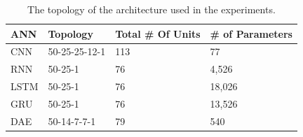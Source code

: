 \documentclass[11pt]{article}
\begin{document}

\begin{table}[]
\centering
\begin{tabular}{@{}llll@{}}
\toprule
ANN  & Topology    & Total \# Of Units & \# of Parameters \\ \midrule
CNN  & 50-25-25-12-1 & 113             & 77               \\
RNN  & 50-25-1     & 76                & 4,526            \\
LSTM & 50-25-1    & 76               & 18,026          \\
GRU  & 50-25-1     & 76                & 13,526           \\
DAE  & 50-14-7-7-1 & 79                & 540              \\ \bottomrule
\end{tabular}
\caption{The topology of the architecture used in the experiments.}
\label{tab:topology}
\end{table}
\end{document}
